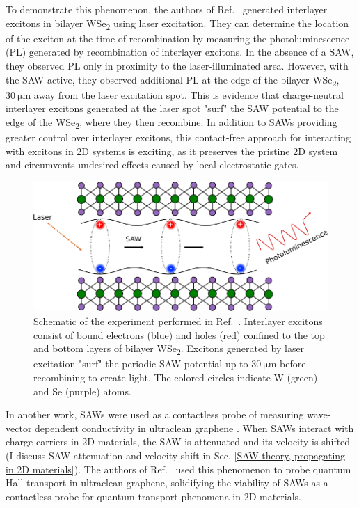 \documentclass[double,12pt,1in,seploa]{beavtex}
\begin{document}
To demonstrate this phenomenon, the authors of Ref.\ \cite{peng_long-range_2022} generated interlayer excitons in bilayer WSe\textsubscript{2} using laser excitation. They can determine the location of the exciton at the time of recombination by measuring the photoluminescence (PL) generated by recombination of interlayer excitons. In the absence of a SAW, they observed PL only in proximity to the laser-illuminated area. However, with the SAW active, they observed additional PL at the edge of the bilayer WSe\textsubscript{2}, $\SI{30}{\micro\meter}$ away from the laser excitation spot. This is evidence that charge-neutral interlayer excitons generated at the laser spot "surf" the SAW potential to the edge of the WSe\textsubscript{2}, where they then recombine. In addition to SAWs providing greater control over interlayer excitons, this contact-free approach for interacting with excitons in 2D systems is exciting, as it preserves the pristine 2D system and circumvents undesired effects caused by local electrostatic gates.


\begin{figure}
    \includegraphics{IX transport fig.pdf}
    \caption{Schematic of the experiment performed in Ref.\ \cite{peng_long-range_2022}. Interlayer excitons consist of bound electrons (blue) and holes (red) confined to the top and bottom layers of bilayer WSe\textsubscript{2}. Excitons generated by laser excitation "surf" the periodic SAW potential up to $\SI{30}{\micro\meter}$ before recombining to create light. The colored circles indicate W (green) and Se (purple) atoms.}
    \label{IX transport fig}
\end{figure}

In another work, SAWs were used as a contactless probe of measuring wave-vector dependent conductivity in ultraclean graphene \cite{fang_quantum_2023}. When SAWs interact with charge carriers in 2D materials, the SAW is attenuated and its velocity is shifted (I discuss SAW attenuation and velocity shift in Sec. \ref{SAW theory, propagating in 2D materials}). The authors of Ref.\ \cite{fang_quantum_2023} used this phenomenon to probe quantum Hall transport in ultraclean graphene, solidifying the viability of SAWs as a contactless probe for quantum transport phenomena in 2D materials. 
\end{document}
